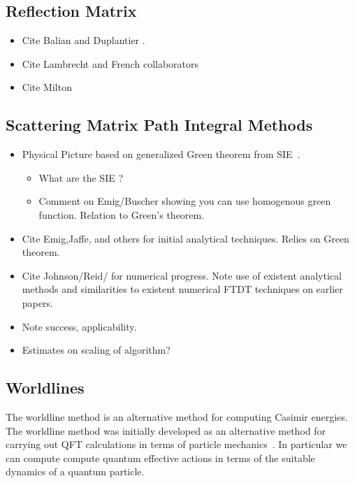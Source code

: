 \subsection{Reflection Matrix}

\begin{itemize}
\item Cite Balian and Duplantier \cite{Balian1977, Balian1978}.
\item Cite Lambrecht and French collaborators
  \cite{Lambrecht2006, MaiaNeto2008,Canaguier-Durand2012}
\item Cite Milton
\end{itemize}

\subsection{Scattering Matrix Path Integral Methods}

\begin{itemize}
\item Physical Picture based on generalized Green theorem from 
  SIE~\cite{Stratton1941}.
\begin{itemize}
\item What are the SIE ?  
\item Comment on Emig/Buscher showing you can use homogenous green function.
  Relation to Green's theorem.
\end{itemize}

\item Cite Emig,Jaffe,  and others for initial analytical techniques.  Relies on Green theorem.
\cite{Emig2004, Emig2007, Rahi2009}
\item Cite Johnson/Reid/ for numerical progress.
  Note use of existent analytical methods and similarities to existent 
numerical FTDT techniques on earlier papers.  \cite{Reid2009,Reid2011, Reid2013} 
\cite{Rodriguez2007,Rodriguez2007a, Rodriguez2009}
\item Note success, applicability.  
\item Estimates on scaling of algorithm?
\end{itemize}

\subsection{Worldlines}

The worldline method is an alternative method for computing Casimir energies.
  The worldline method was initially developed as an alternative method for 
carrying out QFT calculations in terms of particle 
mechanics~\cite{McKeon1993, Strassler1992,Schubert2001}.
  In particular we can compute compute quantum effective actions in terms of
 the suitable dynamics of a quantum particle.

